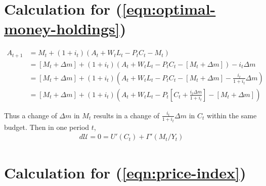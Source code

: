 \documentclass{article}
\newcommand{\?}{\textcolor{red}{(?)}} %
\begin{document}
    
    \section{Calculation for (\ref{eqn:optimal-money-holdings})}\label{calc:optimal-money-holdings}
    
    \begin{align}
        A_{t+1}
        &= M_t + (1+i_t)(A_t + W_t L_t - P_t C_t - M_t)
        \\
        &= [M_t + \Delta m] + (1+i_t)(A_t + W_t L_t - P_t C_t - [M_t + \Delta m]) - i_t \Delta m
        \\
        &= [M_t + \Delta m]
        + (1+i_t)\left(
          A_t + W_t L_t - P_t C_t - [M_t + \Delta m] - \frac{i_t}{1+i_t} \Delta m \right)
         \\
         &= [M_t + \Delta m]
        + (1+i_t)\left(
          A_t + W_t L_t - P_t \left[C_t + \frac{i_t \Delta m}{1+i_t} \right] - [M_t + \Delta m] \right)
    \end{align}
    
    Thus a change of $\Delta m$ in $M_t$ results in a change of $\frac{i_t}{1+i_t} \Delta m$ in $C_t$ within the same budget.
    Then in one period $t$,
    \begin{align}
        d \mathcal{U} = 0 = U'(C_t) + \Gamma'(M_t / Y_t)
    \end{align}
    
    \section{Calculation for (\ref{eqn:price-index})}\label{calc:price-index}
    
\end{document}
